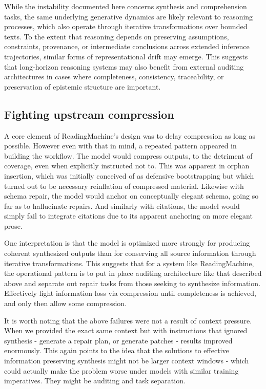 \documentclass[
  11pt,
]{article}
\begin{document}
While the instability documented here concerns synthesis and comprehension 
tasks, the same underlying generative dynamics are likely relevant to 
reasoning processes, which also operate through iterative transformations 
over bounded texts. To the extent that reasoning depends on preserving 
assumptions, constraints, provenance, or intermediate conclusions across 
extended inference trajectories, similar forms of representational drift 
may emerge. This suggests that long-horizon reasoning systems may also benefit 
from external auditing architectures in cases where completeness, consistency, 
traceability, or preservation of epistemic structure are important.

\subsection{Fighting upstream compression}\label{fighting-upstream-compression}

A core element of ReadingMachine's design was to delay compression as long as 
possible. However even with that in mind, a repeated pattern appeared in 
building the workflow. The model would compress outputs, to the detriment 
of coverage, even when explicitly instructed not to. This was apparent in 
orphan insertion, which was initially conceived of as defensive bootstrapping 
but which turned out to be necessary reinflation of compressed material. 
Likewise with schema repair, the model would anchor on conceptually elegant 
schema, going so far as to hallucinate repairs. And similarly with citations, 
the model would simply fail to integrate citations due to its apparent anchoring 
on more elegant prose. 

One interpretation is that the model is optimized more strongly for producing 
coherent synthesized outputs than for conserving all source information through 
iterative transformations. This suggests that for a system like ReadingMachine, 
the operational pattern is to put in place auditing architecture like that 
described above and separate out repair tasks from those seeking to synthesize 
information. Effectively fight information loss via compression until completeness 
is achieved, and only then allow some compression. 

It is worth noting that the above failures were not a result of context pressure. 
When we provided the exact same context but with instructions that ignored synthesis - 
generate a repair plan, or generate patches - results improved enormously. This again 
points to the idea that the solutions to effective information preserving synthesis 
might not be larger context windows - which could actually make the problem worse 
under models with similar training imperatives. They might be auditing and task separation.
\end{document}
